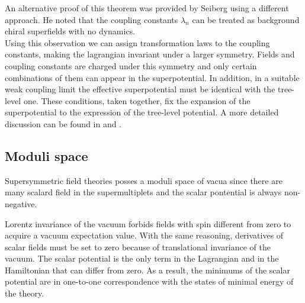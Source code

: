 An alternative proof of this theorem was provided by Seiberg \cite{Seiberg:1993vc} using a different approach.
He noted that the coupling constants $\lambda_n$ can be treated as background chiral superfields with no dynamics.
\\
Using this observation we can assign transformation laws to the coupling constants, making the lagrangian invariant under a larger symmetry.
Fields and coupling constants are charged under this symmetry and only certain combinations of them can appear in the superpotential.
In addition, in a suitable weak coupling limit the effective superpotential must be identical with the tree-level one.
These conditions, taken together, fix the expansion of the superpotential to the expression of the tree-level potential.
A more detailed discussion can be found in \cite{Seiberg:1994bp} and \cite{Intriligator:1995au}.






\subsection{Moduli space}
\label{sec:subsection_moduli_space}
Supersymmetric field theories posses a moduli space of vacua since there are many scalard field in the supermultiplets and the scalar pontential is always non-negative.

Lorentz invariance of the vacuum forbids fields with spin different from zero to acquire a vacuum expectation value.
With the same reasoning, derivatives of scalar fields must be set to zero because of translational invariance of the vacuum.
The scalar potential is the only term in the Lagrangian and in the Hamiltonian that can differ from zero.
As a result, the minimums of the scalar potential are in one-to-one correspondence with the states of minimal energy of the theory.


